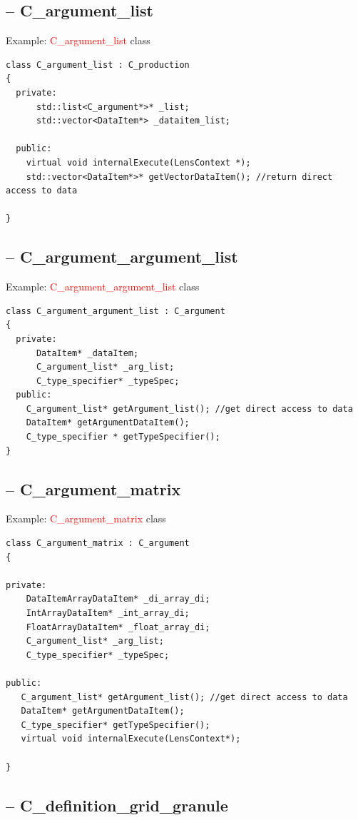 \subsection{-- C\_argument\_list}
\label{sec:C_argument_list}
Example: \textcolor{red}{C\_argument\_list} class
\begin{verbatim}
class C_argument_list : C_production
{
  private:
      std::list<C_argument*>* _list;
      std::vector<DataItem*> _dataitem_list;

  public:
    virtual void internalExecute(LensContext *);
    std::vector<DataItem*>* getVectorDataItem(); //return direct access to data
  
}
\end{verbatim}

\subsection{-- C\_argument\_argument\_list}
\label{sec:C_argument_argument_list}
Example: \textcolor{red}{C\_argument\_argument\_list} class
\begin{verbatim}
class C_argument_argument_list : C_argument
{
  private:
      DataItem* _dataItem;
      C_argument_list* _arg_list;
      C_type_specifier* _typeSpec;
  public:
    C_argument_list* getArgument_list(); //get direct access to data
    DataItem* getArgumentDataItem();
    C_type_specifier * getTypeSpecifier();
}
\end{verbatim}

\subsection{-- C\_argument\_matrix}
\label{sec:C_argument_matrix}
Example: \textcolor{red}{C\_argument\_matrix} class
\begin{verbatim}
class C_argument_matrix : C_argument
{

private:
    DataItemArrayDataItem* _di_array_di;
    IntArrayDataItem* _int_array_di;
    FloatArrayDataItem* _float_array_di;
    C_argument_list* _arg_list;
    C_type_specifier* _typeSpec;
    
public:
   C_argument_list* getArgument_list(); //get direct access to data
   DataItem* getArgumentDataItem();
   C_type_specifier* getTypeSpecifier();
   virtual void internalExecute(LensContext*);

}
\end{verbatim}

\subsection{-- C\_definition\_grid\_granule}
\label{sec:C_definition_grid_granule}

